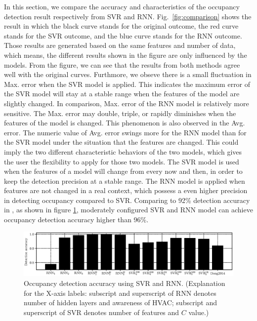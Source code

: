 In this section, we compare the accuracy and characteristics of the
occupancy detection result respectively from SVR and RNN.
Fig.~\ref{fig:comparison} shows the result in which the black curve
stands for the original outcome, the red curve stands for the SVR
outcome, and the blue curve stands for the RNN outcome.  Those results
are generated based on the same features and number of data, which
means, the different results shown in the figure are only influenced
by the models. From the figure, we can see that the results from both
methods agree well with the original curves.  Furthmore, we obseve
there is a small fluctuation in Max. error when the SVR model is
applied. This indicates the maximum error of the SVR model will stay
at a stable range when the features of the model are slightly
changed. In comparison, Max. error of the RNN model is relatively more
sensitive. The Max. error may double, triple, or rapidly diminishes
when the features of the model is changed. This phenomenon is also
observed in the Avg. error. The numeric value of Avg. error swings
more for the RNN model than for the SVR model under the situation that
the features are changed. This could imply the two different
characteristic behaviors of the two models, which gives the user the
flexibility to apply for those two models. The SVR model is used when
the features of a model will change from every now and then, in order
to keep the detection precision at a stable range. The RNN model is applied
when features are not changed in a real context, which possess a even higher
precision in detecting occupancy compared to SVR. Comparing to 92\% detection
accuracy in \cite {dong2014real}, as shown in figure
\ref{fig:accuracy-comparison}, moderately configured SVR and RNN model can
achieve occupancy detection accuracy higher than 96\%.

\begin{figure}[h]
    \centering
    \includegraphics[width=\textwidth]{./figs/results/results_compare.eps}
    \caption{Occupancy detection accuracy using SVR and RNN. (Explanation for
    the X-axis labels: subscript and superscript of RNN denotes number of
    hidden layers and awareness of HVAC; subscript and superscript of SVR
    denotes number of features and $C$ value.)}
    \label{fig:accuracy-comparison}
\end{figure}

